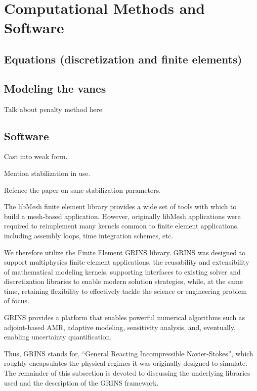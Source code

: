 \section{Computational Methods and Software}
\label{sec:software}

\subsection{Equations (discretization and finite elements)}

\subsection{Modeling the vanes}

Talk about penalty method here

\subsection{Software}

Cast into weak form. 

Mention stabilization in use. 

Refence the paper on sane stabilization parameters. 

The libMesh\cite{libmesh} finite element library
provides a wide set of tools with which to build a mesh-based
application. However, originally libMesh applications were required to
reimplement many kernels common to finite element applications,
including assembly loops, time integration schemes, etc. 

We therefore utilize the Finite Element GRINS library\cite{grins}.
GRINS was designed to support multiphysics finite element
applications, the reusability and extensibility of mathematical
modeling kernels, supporting interfaces to existing solver and
discretization libraries to enable modern solution strategies, while, at
the same time, retaining flexibility to effectively tackle the science
or engineering problem of focus. 

GRINS provides a platform that enables powerful numerical algorithms
such as adjoint-based AMR, adaptive modeling, sensitivity analysis,
and, eventually, enabling uncertainty quantification.

Thus, GRINS stands for, ``General Reacting Incompressible Navier-Stokes'',
which roughly encapsulates the physical regimes it was originally
designed to simulate. 
The remainder of this subsection is devoted to discussing the underlying
libraries used and the description of the GRINS framework. 


